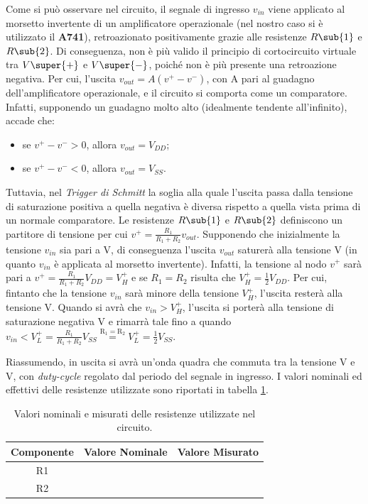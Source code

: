 \noindent
Come si può osservare nel circuito, il segnale di ingresso $v_{in}$ viene applicato al morsetto invertente di un amplificatore operazionale (nel nostro caso si è utilizzato il \textbf{\textmu A741}), retroazionato positivamente grazie alle resistenze $R\sub{1}$ e $R\sub{2}$. Di conseguenza, non è più valido il principio di cortocircuito virtuale tra $V\super{+}$ e $V\super{-}$, poiché non è più presente una retroazione negativa. Per cui, l'uscita $v_{out}=A(v^+-v^-)$, con A pari al guadagno dell'amplificatore operazionale, e il circuito si comporta come un comparatore. Infatti, supponendo un guadagno molto alto (idealmente tendente all'infinito), accade che:
\begin{itemize}
	\item se $v^+-v^->0$, allora $v_{out}=V_{DD}$;
	\item se $v^+-v^-<0$, allora $v_{out}=V_{SS}$.
\end{itemize}
Tuttavia, nel \textit{Trigger di Schmitt} la soglia alla quale l'uscita passa dalla tensione di saturazione positiva a quella negativa è diversa rispetto a quella vista prima di un normale comparatore. Le resistenze $R\sub{1}$ e $R\sub{2}$ definiscono un partitore di tensione per cui $v^+=\frac{R_1}{R_1+R_2}v_{out}$. Supponendo che inizialmente la tensione $v_{in}$ sia pari a V, di conseguenza l'uscita $v_{out}$ saturerà alla tensione V (in quanto $v_{in}$ è applicata al morsetto invertente). Infatti, la tensione al nodo $v^+$ sarà pari a $v^+=\frac{R_1}{R_1+R_2}V_{DD}=V_H^+$ e se $R_1=R_2$ risulta che $V_H^+=\frac{1}{2}V_{DD}$. Per cui, fintanto che la tensione $v_{in}$ sarà minore della tensione $V_H^+$, l'uscita resterà alla tensione V. Quando si avrà che $v_{in}>V_H^+$, l'uscita si porterà alla tensione di saturazione negativa V e rimarrà tale fino a quando $v_{in}<V_L^+=\frac{R_1}{R_1+R_2}V_{SS}\overset{\mathrm{R_1=R_2}}{=}V_L^+=\frac{1}{2}V_{SS}$. 

\noindent
Riassumendo, in uscita si avrà un'onda quadra che commuta tra la tensione V e V, con \textit{duty-cycle} regolato dal periodo del segnale in ingresso. 
I valori nominali ed effettivi delle resistenze utilizzate sono riportati in tabella \ref{tab:valori_componenti_2}.

\def\arraystretch{1.3}
\begin{table}[h]
	\centering
	\begin{tabular}{|c|c|c|}
		\hline
		Componente	& Valore Nominale & Valore Misurato \\ \hline
		R1 & & \\ \hline
		R2 & & \\ \hline
	\end{tabular}
	\caption{Valori nominali e misurati delle resistenze utilizzate nel circuito.}
	\label{tab:valori_componenti_2}
\end{table}

